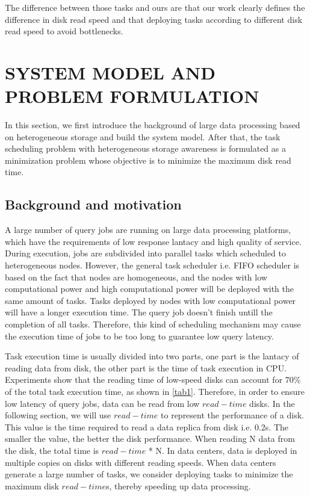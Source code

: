 \documentclass[conference]{IEEEtran}
\begin{document}
The difference between those tasks and ours are that our work clearly defines the difference in disk read speed and that deploying tasks according to different disk read speed to avoid bottlenecks.

\section{SYSTEM MODEL AND PROBLEM FORMULATION}\label{SYSTEM_MODEL}
In this section, we first introduce the background of large data processing based on heterogeneous storage and build the system model. After that, the task scheduling problem with heterogeneous storage awareness is formulated as a  minimization problem whose objective is to minimize the maximum disk read time.

\subsection{Background and motivation}\label{AA}

A large number of query jobs are running on large data processing platforms, which have the requirements of low response lantacy and high quality of service. During execution, jobs are subdivided into parallel tasks which scheduled to heterogeneous nodes. However, the general task scheduler i.e. FIFO scheduler is based on the fact that nodes are homogeneous, and the nodes with low computational power and high computational power will be deployed with the same amount of tasks. Tasks deployed by nodes with low computational power will have a longer execution time. The query job doesn't finish untill the completion of all tasks. Therefore, this kind of scheduling mechanism may cause the execution time of jobs to be too long to guarantee low query latency.

Task execution time is usually divided into two parts, one part is the lantacy of reading data from disk, the other part is the time of task execution in CPU. Experiments show that the reading time of low-speed disks can account for 70\% of the total task execution time, as shown in \ref{tab1}. Therefore, in order to ensure low latency of query jobs, data can be read from low $read-time$ disks. In the following section, we will use $read-time$ to represent the performance of a disk. This value is the time required to read a data replica from disk i.e. 0.2s. The smaller the value, the better the disk performance. When reading N data from the disk, the total time is $read-time$ * N. In data centers, data is deployed in multiple copies on disks with different reading speeds. When data centers generate a large number of tasks, we consider deploying tasks to minimize the maximum disk $read-time$s,  thereby speeding up data processing.%
\end{document}
